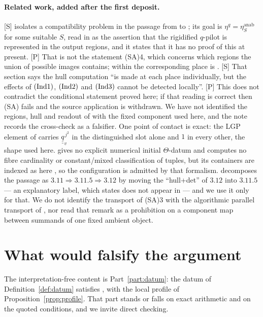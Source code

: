 \documentclass[11pt]{article}
\theoremstyle{plain}
\theoremstyle{definition}
\newcommand{\Ind}[1]{\textup{(Ind#1)}}
\newcommand{\SA}{\textup{(SA)}}
\begin{document}
\paragraph{Related work, added after the first deposit.}
\textup{[S]} \cite{LANA} isolates a compatibility problem in the passage from
\cite[Thm.~3.11]{IUT3} to \cite[Cor.~3.12]{IUT3}; its goal \cite[\S9.2]{LANA} is
$\eta^{q}=\eta^{\mathrm{anab}}_{S}$ for some suitable $S$, read in
\cite[\S9.3]{LANA} as the assertion that the rigidified $q$-pilot is represented
in the output regions, and it states that it has no proof of this at present.
\textup{[P]} That is not the statement \SA4, which concerns which regions the
union of possible images contains; within \cite{LANA} the corresponding place is
\cite[\S10.4]{LANA}.  \textup{[S]} That section says the hull computation ``is
made at each place individually, but the effects of $\Ind1$, $\Ind2$ and $\Ind3$
cannot be detected locally''.  \textup{[P]} This does not contradict the
conditional statement proved here; if that reading is correct then \SA{} fails and
the source application is withdrawn.  We have not identified the regions, hull and
readout of \cite{LANA} with the fixed component used here, and the note records
the cross-check as a falsifier.  One point of contact is exact: the LGP element of
\cite[\S5.2(f)]{LANA} carries $\underline{\underline q}_v^{\,j^2}$ in the
distinguished slot alone and $1$ in every other, the shape used here.
\cite{LANA} gives no explicit numerical initial $\Theta$-datum and computes no
fibre cardinality or constant/mixed classification of tuples, but its containers
are indexed as here \cite[\S5.2(a)]{LANA}, so the configuration is admitted by
that formalism.  \cite{Form} decomposes the passage as
$3.11\Rightarrow3.11.5\Rightarrow3.12$ by moving the ``hull+det'' of $3.12$ into
$3.11.5$ --- an explanatory label, which \cite{Form} states does not appear in
\cite{IUT1,IUT2,IUT3,IUT4} --- and we use it only for that.  We do not identify
the transport of \SA3 with the algorithmic parallel transport of
\cite[Rem.~3.11.1(iv)]{IUT3}, nor read that remark as a prohibition on a component
map between summands of one fixed ambient object.

\section{What would falsify the argument}\label{sec:falsify}

The interpretation-free content is Part~\ref{part:datum}: the datum of
Definition~\ref{def:datum} satisfies \cite[Definition 3.1]{IUT1}, with the local
profile of Proposition~\ref{prop:profile}.  That part stands or falls on exact
arithmetic and on the quoted conditions, and we invite direct checking.
\end{document}

